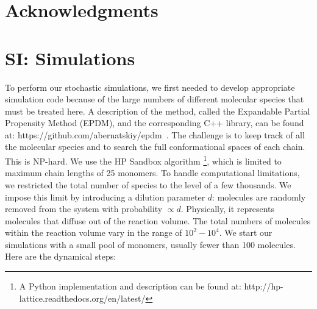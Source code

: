 \documentclass[twocolumn,letterpaper]{revtex4}
\begin{document}
\section*{Acknowledgments}

\newpage
\appendix
 \section*{SI: Simulations}
To perform our stochastic simulations, we first needed to develop appropriate simulation code 
because of the large numbers of different molecular species that must be treated here.  A 
description of the method, called the Expandable Partial Propensity Method (EPDM), and the 
corresponding C++ library, can be found at: 
https://github.com/abernatskiy/epdm~\cite{Guseva2016b}. 
The challenge is to keep track of all the molecular species and to search the full conformational 
spaces of each 
chain.  This is NP-hard.  We use the HP Sandbox algorithm\cite{lau1989lattice,Dill2008a} 
\footnote{A 
Python implementation and description can be found at: 
http://hp-lattice.readthedocs.org/en/latest/}, which is limited to maximum chain lengths of 25 
monomers.  To handle computational limitations, we restricted the total number of species to the 
level of a few thousands.  We impose this limit by introducing a dilution parameter $d$: molecules 
are randomly removed from the system with probability $\propto d$.  Physically, it represents 
molecules that diffuse out of the reaction volume.  The total numbers of molecules within the 
reaction volume vary in the range of $10^2-10^4$.  We start our simulations with a small pool of 
monomers, usually fewer than 100 molecules.  Here are the dynamical steps:
\end{document}
